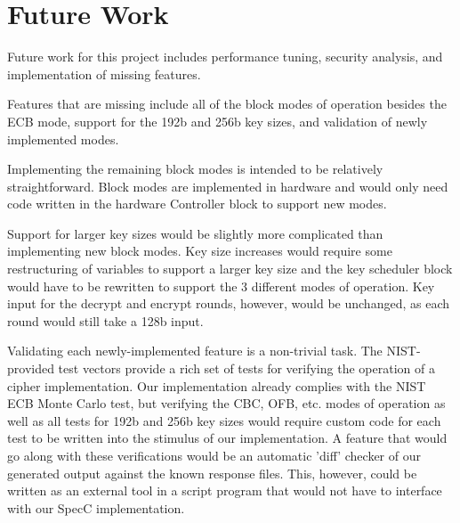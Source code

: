 \section{Future Work} \label{sec:futurework}
Future work for this project includes performance tuning, security analysis, and implementation of missing features.

Features that are missing include all of the block modes of operation besides the ECB mode, support for the 192b and 256b key sizes, and validation of newly implemented modes.  

Implementing the remaining block modes is intended to be relatively straightforward.  Block modes are implemented in hardware and would only need code written in the hardware Controller block to support new modes.

Support for larger key sizes would be slightly more complicated than implementing new block modes.  Key size increases would require some restructuring of variables to support a larger key size and the key scheduler block would have to be rewritten to support the 3 different modes of operation.  Key input for the decrypt and encrypt rounds, however, would be unchanged, as each round would still take a 128b input.

Validating each newly-implemented feature is a non-trivial task.  The NIST-provided test vectors provide a rich set of tests for verifying the operation of a cipher implementation.  Our implementation already complies with the NIST ECB Monte Carlo test, but verifying the CBC, OFB, etc. modes of operation as well as all tests for 192b and 256b key sizes would require custom code for each test to be written into the stimulus of our implementation.  A feature that would go along with these verifications would be an automatic 'diff' checker of our generated output against the known response files.  This, however, could be written as an external tool in a script program that would not have to interface with our SpecC implementation.

